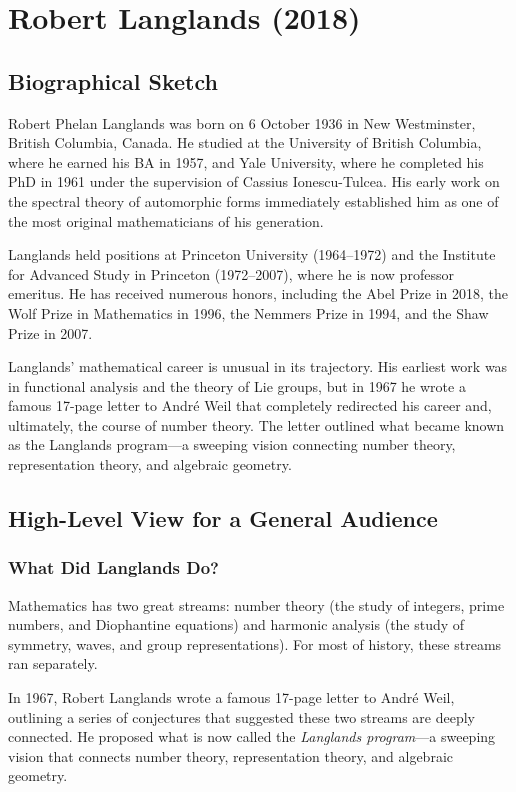 \chapter{Robert Langlands (2018)}

\section{Biographical Sketch}

Robert Phelan Langlands was born on 6 October 1936 in New Westminster, British Columbia, Canada. He studied at the University of British Columbia, where he earned his BA in 1957, and Yale University, where he completed his PhD in 1961 under the supervision of Cassius Ionescu-Tulcea. His early work on the spectral theory of automorphic forms immediately established him as one of the most original mathematicians of his generation.

Langlands held positions at Princeton University (1964--1972) and the Institute for Advanced Study in Princeton (1972--2007), where he is now professor emeritus. He has received numerous honors, including the Abel Prize in 2018, the Wolf Prize in Mathematics in 1996, the Nemmers Prize in 1994, and the Shaw Prize in 2007.

Langlands' mathematical career is unusual in its trajectory. His earliest work was in functional analysis and the theory of Lie groups, but in 1967 he wrote a famous 17-page letter to Andr\'e Weil that completely redirected his career and, ultimately, the course of number theory. The letter outlined what became known as the Langlands program---a sweeping vision connecting number theory, representation theory, and algebraic geometry.

\section{High-Level View for a General Audience}

\subsection{What Did Langlands Do?}

Mathematics has two great streams: number theory (the study of integers, prime numbers, and Diophantine equations) and harmonic analysis (the study of symmetry, waves, and group representations). For most of history, these streams ran separately.

In 1967, Robert Langlands wrote a famous 17-page letter to Andr\'e Weil, outlining a series of conjectures that suggested these two streams are deeply connected. He proposed what is now called the \emph{Langlands program}---a sweeping vision that connects number theory, representation theory, and algebraic geometry.

